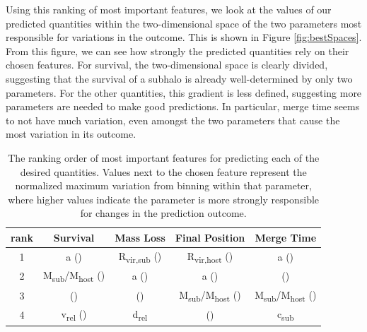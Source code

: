 \documentclass[fleqn,usenatbib]{mnras}
\begin{document}
 Using this ranking of most important features, we look at the values of our predicted quantities within the two-dimensional space of the two parameters most responsible for variations in the outcome. This is shown in Figure \ref{fig:bestSpaces}. From this figure, we can see how strongly the predicted quantities rely on their chosen features. For survival, the two-dimensional space is clearly divided, suggesting that the survival of a subhalo is already well-determined by only two parameters. For the other quantities, this gradient is less defined, suggesting more parameters are needed to make good predictions. In particular, merge time seems to not have much variation, even amongst the two parameters that cause the most variation in its outcome. 

\begin{table}
	\centering
	\caption{The ranking order of most important features for predicting each of the desired quantities. Values next to the chosen feature represent the normalized maximum variation from binning within that parameter, where higher values indicate the parameter is more strongly responsible for changes in the prediction outcome.}
	\label{tab:FS_table}
	\begin{tabular}{c|cccc} %
		\hline
		rank & Survival & Mass Loss & Final Position & Merge Time\\
		\hline
		1 & a () & R\textsubscript{vir,sub} () & R\textsubscript{vir,host} () & a ()\\
		2 & M\textsubscript{sub}/M\textsubscript{host} () & a () & a () & \textepsilon ()\\
		3 & \textepsilon () & \textepsilon () & M\textsubscript{sub}/M\textsubscript{host} () & M\textsubscript{sub}/M\textsubscript{host} ()\\
		4 & v\textsubscript{rel} () & d\textsubscript{rel} & \textepsilon () & c\textsubscript{sub}\\
		\hline
	\end{tabular}
\end{table}
\end{document}
